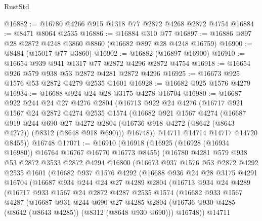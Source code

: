 \begin{lexlean}{RustStd}
\begin{coremodule}
@16882 := @16780 @4266 @915 @1318 @77 @2872 @4268 @2872 @4754
@16884 := @8471 @8064 @2535
@16886 := @16884 @310 @77
@16897 := @16886 @897 @28 @2872 @4248 @3860 @8860 (@16682 @897 @28 @4248 @16759)
@16900 := @8484 (@15017 @77 @3860)
@16902 := @16882 (@16897 @16900)
@16910 := @16654 @939 @941 @1317 @77 @2872 @4296 @2872 @4754
@16918 := @16654 @926 @579 @938 @53 @2872 @4281 @2872 @4296
@16925 := @16673 @925 @1576 @53 @2872 @4279 @2535 @1601
@16928 := @16682 @925 @1576 @4279
@16934 := @16688 @924 @24 @28 @3175 @4278 @16704
@16980 := @16687
    @922
    @244
    @24
    @27
    @4276
    @2804
    (@16713
      @922
      @24
      @4276
      (@16717
        @921
        @1567
        @24
        @2872
        @4274
        @2535
        @1574
        (@16682
          @921
          @1567
          @4274
          (@16687
            @919
            @244
            @690
            @27
            @4272
            @2804
            (@16736 @918 @4272 (@8642 (@8643 @4272)) (@8312 (@8648 @918 @690)))
            @16748))
        @14711
        @14714
        @14717
        @14720
        @8455))
    @16748
@17071 := @16910
    (@16918
      (@16925 (@16928 (@16934 @16980)) @16764 @16767 @16770 @16773 @8455)
      (@16780
        @4281
        @579
        @938
        @53
        @2872
        @3533
        @2872
        @4294
        @16800
        (@16673
          @937
          @1576
          @53
          @2872
          @4292
          @2535
          @1601
          (@16682
            @937
            @1576
            @4292
            (@16688
              @936
              @24
              @28
              @3175
              @4291
              @16704
              (@16687
                @934
                @244
                @24
                @27
                @4289
                @2804
                (@16713
                  @934
                  @24
                  @4289
                  (@16717
                    @933
                    @1567
                    @24
                    @2872
                    @4287
                    @2535
                    @1574
                    (@16682
                      @933
                      @1567
                      @4287
                      (@16687
                        @931
                        @244
                        @690
                        @27
                        @4285
                        @2804
                        (@16736 @930 @4285 (@8642 (@8643 @4285)) (@8312 (@8648 @930 @690)))
                        @16748))
                    @14711

\end{coremodule}
\end{lexlean}
